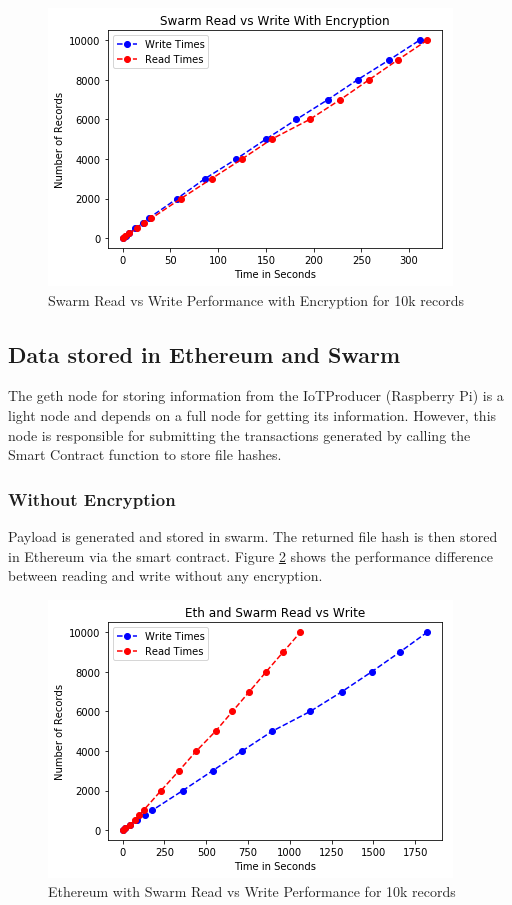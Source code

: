 \documentclass[11pt,openright]{report}
\begin{document}
\begin{figure}
    \centering
    \includegraphics[scale=1]{results/graphs/Swarm_Read_v_Write_Encr.png}
    \caption{Swarm Read vs Write Performance with Encryption for 10k records}
    \label{fig:graph_swarm_readvwrite_encr}
\end{figure}

\subsection{Data stored in Ethereum and Swarm}
The geth node for storing information from the IoTProducer (Raspberry Pi) is a light node and depends on a full node for getting its information. However, this node is responsible for submitting the transactions generated by calling the Smart Contract function to store file hashes.

\subsubsection{Without Encryption}
Payload is generated and stored in swarm. The returned file hash is then stored in Ethereum via the smart contract. Figure \ref{fig:graph_eth_swarm_readvwrite} shows the performance difference between reading and write without any encryption.

\begin{figure}
    \centering
    \includegraphics[scale=1]{results/graphs/Eth_Swarm_Read_v_Write.png}
    \caption{Ethereum with Swarm Read vs Write Performance for 10k records}
    \label{fig:graph_eth_swarm_readvwrite}
\end{figure}
\end{document}
